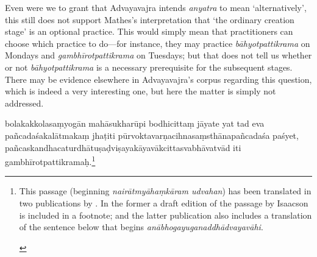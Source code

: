 \documentclass[naipra.tex]{subfiles}
\begin{document}
\begin{sanskrit}
{\begin{english}
	Even were we to grant that Advayavajra intends \emph{anyatra} to mean `alternatively', this still does not support Mathes's interpretation that `the ordinary creation stage' is an optional practice.
	This would simply mean that practitioners can choose which practice to do—for instance, they may practice \emph{bāhyotpattikrama} on Mondays and \emph{gambhīrotpattikrama} on Tuesdays; but that does not tell us whether or not \emph{bāhyotpattikrama} is a necessary prerequisite for the subsequent stages.
	There may be evidence elsewhere in Advayavajra's corpus regarding this question, which is indeed a very interesting one, but here the matter is simply not addressed.
\end{english}} bolakakkolasaṃyogān mahāsukharūpi  bodhicittaṃ jāyate yat tad eva pañcadaśakalātmakaṃ jhaṭiti pūrvoktavarṇacihnasaṃsthānapañcadaśa paśyet,  pañcaskandhacaturdhātuṣaḍviṣayakāyavākcittasvabhāvatvād iti gambhīrotpattikramaḥ.\footnote{\begin{english}
	This passage (beginning \emph{nairātmyāhaṃkāram udvahan}) has been translated in two publications by \textcites[373–4]{mathes2014}[132-3]{mathes2021}.
	In the former a draft edition of the passage by \textsf{Isaacson} is included in a footnote; and the latter publication also includes a translation of the sentence below that begins \emph{anābhogayuganaddhādvayavāhi}.
\end{english}}
\pend 




\end{sanskrit}
\end{document}

